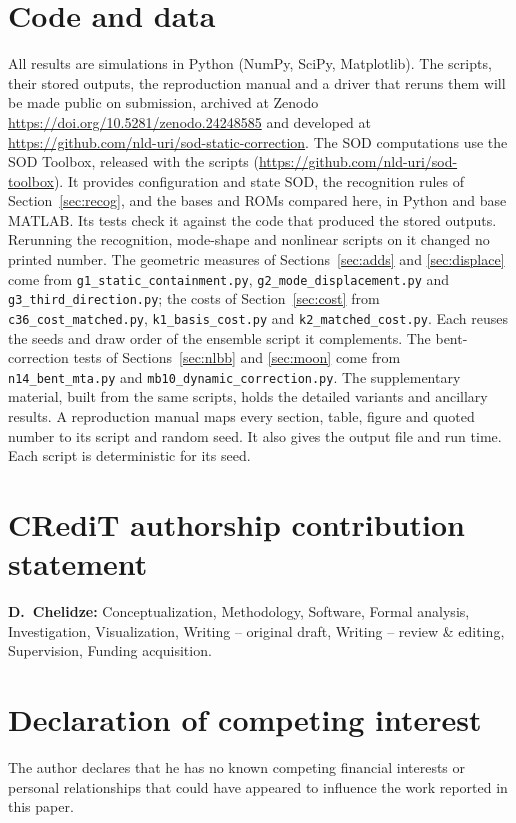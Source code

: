 \documentclass[preprint,12pt]{elsarticle}
\begin{document}
\section{Code and data}\label{app:repro}
All results are simulations in Python (NumPy, SciPy, Matplotlib). The scripts, their stored outputs, the reproduction manual and a driver that reruns them will be made public on submission, archived at Zenodo \url{https://doi.org/10.5281/zenodo.24248585} and developed at \url{https://github.com/nld-uri/sod-static-correction}.
The SOD computations use the SOD Toolbox, released with the scripts (\url{https://github.com/nld-uri/sod-toolbox}).
It provides configuration and state SOD, the recognition rules of Section~\ref{sec:recog}, and the bases and ROMs compared here, in Python and base MATLAB.
Its tests check it against the code that produced the stored outputs. Rerunning the recognition, mode-shape and nonlinear scripts on it changed no printed number.
The geometric measures of Sections~\ref{sec:adds} and \ref{sec:displace} come from \texttt{g1\_static\_containment.py}, \texttt{g2\_mode\_displacement.py} and \texttt{g3\_third\_direction.py}; the costs of Section~\ref{sec:cost} from \texttt{c36\_cost\_matched.py}, \texttt{k1\_basis\_cost.py} and \texttt{k2\_matched\_cost.py}. Each reuses the seeds and draw order of the ensemble script it complements.
The bent-correction tests of Sections~\ref{sec:nlbb} and \ref{sec:moon} come from \texttt{n14\_bent\_mta.py} and \texttt{mb10\_dynamic\_correction.py}. The supplementary material, built from the same scripts, holds the detailed variants and ancillary results.
A reproduction manual maps every section, table, figure and quoted number to its script and random seed. It also gives the output file and run time. Each script is deterministic for its seed.

\section*{CRediT authorship contribution statement}
\textbf{D.~Chelidze:} Conceptualization, Methodology, Software, Formal analysis, Investigation, Visualization, Writing -- original draft, Writing -- review \& editing, Supervision, Funding acquisition.

\section*{Declaration of competing interest}
The author declares that he has no known competing financial interests or personal relationships that could have appeared to influence the work reported in this paper.
\end{document}
